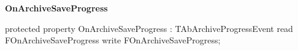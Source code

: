 \documentclass{report}
\newif\ifpdf
\begin{document}
\begin{list}{}
\begin{flushleft}
\ifpdf
\end{flushleft}
\fi


\par  \label{AbZipper.TAbCustomZipper-OnArchiveSaveProgress}
\item[\textbf{OnArchiveSaveProgress}\hfill]
\ifpdf
\begin{flushleft}
\fi
\begin{ttfamily}
protected property OnArchiveSaveProgress : TAbArchiveProgressEvent           
      read FOnArchiveSaveProgress                                      
      write FOnArchiveSaveProgress;\end{ttfamily}

\ifpdf
\end{flushleft}
\fi


\par  \end{list}
\end{document}
